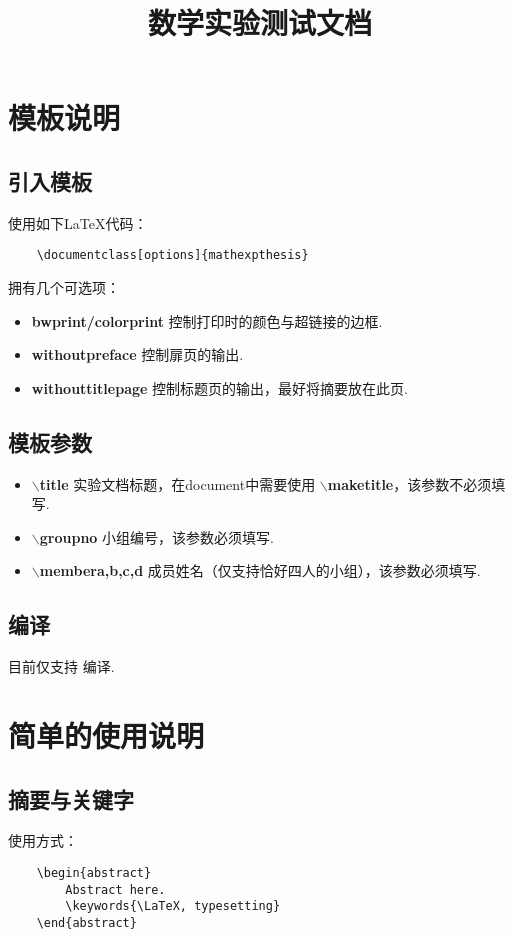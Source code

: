 \documentclass[bwprint, withouttitlepage]{mathexpthesis}
\title{数学实验测试文档}
\begin{document}
\maketitle
\tableofcontents
\newpage
\section{模板说明}
\subsection{引入模板}
使用如下\LaTeX 代码：
\begin{verbatim}
    \documentclass[options]{mathexpthesis}
\end{verbatim}

拥有几个可选项：
\begin{itemize}[itemindent=2em]
    \item \textbf{bwprint/colorprint} 控制打印时的颜色与超链接的边框.
    \item \textbf{withoutpreface} 控制扉页的输出.
    \item \textbf{withouttitlepage} 控制标题页的输出，最好将摘要放在此页.
\end{itemize}

\subsection{模板参数}
\begin{itemize}[itemindent=2em]
    \item \textbf{$\backslash$title} 实验文档标题，在document中需要使用 \textbf{$\backslash$maketitle}，该参数不必须填写.
    \item \textbf{$\backslash$groupno} 小组编号，该参数必须填写.
    \item \textbf{$\backslash$membera,b,c,d} 成员姓名（仅支持恰好四人的小组），该参数必须填写.
\end{itemize}

\subsection{编译}
目前仅支持 编译.

\section{简单的使用说明}
\subsection{摘要与关键字}
使用方式：
\begin{verbatim}
    \begin{abstract}
        Abstract here.
        \keywords{\LaTeX, typesetting}
    \end{abstract}
\end{verbatim}
\end{document}
